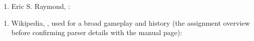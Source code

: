 \documentclass[letterpaper,10pt,english]{sphinxmanual}
\begin{document}
\begin{enumerate}
%
\item {} 
\sphinxAtStartPar
Eric S. Raymond, :

\end{enumerate}
\begin{quote}

\sphinxAtStartPar
{}
\end{quote}
\begin{enumerate}
%
\item {} 
\sphinxAtStartPar
Wikipedia, , used for a broad gameplay and history (the assignment overview before confirming parser details with the manual page): 

\end{enumerate}



\renewcommand{\indexname}{Index}
\printindex
\end{document}
